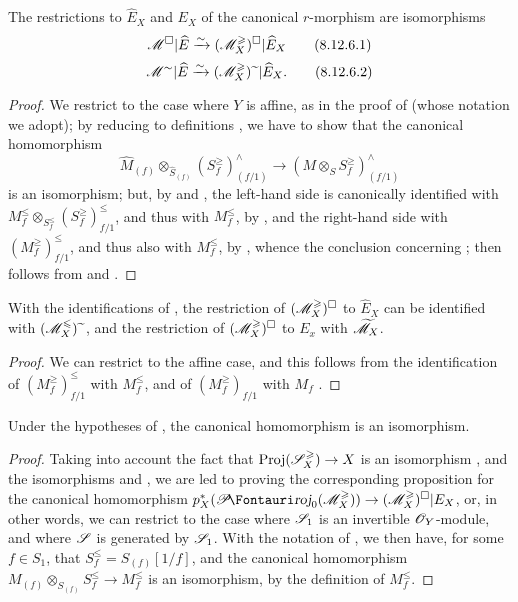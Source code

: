 \begin{proposition}[8.12.6]
\label{II.8.12.6}
The restrictions to $\widehat{E}_X$ and $E_X$ of the canonical $r$-morphism  are isomorphisms
\[
\label{II.8.12.6.1}
    \mathscr{M}^\square|\widehat{E} \xrightarrow{\sim} (\mathscr{M}_X^\geqslant)^\square|\widehat{E}_X
\tag{8.12.6.1}
\]
\[
\label{II.8.12.6.2}
    \mathscr{M}^\sim|\widehat{E} \xrightarrow{\sim} (\mathscr{M}_X^\geqslant){\,\widetilde{\,}\,}|\widehat{E}_X.
\tag{8.12.6.2}
\]
\end{proposition}

\begin{proof}
We restrict to the case where $Y$ is affine, as in the proof of  (whose notation we adopt);
by reducing to definitions , we have to show that the canonical homomorphism
\[
    \widehat{M}_{(f)}\otimes_{\widehat{S}_{(f)}}(S_f^\geq)_{(f/1)}^\wedge \to (M\otimes_S S_f^\geq)_{(f/1)}^\wedge
\]
is an isomorphism;
but, by  and , the left-hand side is canonically identified with $M_f^\leq\otimes_{S_f^\leq}(S_f^\geq)_{f/1}^\leq$, and thus with $M_f^\leq$, by , and the right-hand side with $(M_f^\geq)_{f/1}^\leq$, and thus also with $M_f^\leq$, by , whence the conclusion concerning ;
 then follows from  and .
\end{proof}

\begin{corollary}[8.12.7]
\label{II.8.12.7}
With the identifications of , the restriction of $(\mathscr{M}_X^\geqslant)^\square$ to $\widehat{E}_X$ can be identified with $(\mathscr{M}_X^\leqslant){\,\widetilde{\,}\,}$, and the restriction of $(\mathscr{M}_X^\geqslant)^\square$ to $E_x$ with $\widetilde{\mathscr{M}}_X$.
\end{corollary}

\begin{proof}
We can restrict to the affine case, and this follows from the identification of $(M_f^\geq)_{f/1}^\leq$ with $M_f^\leq$, and of $(M_f^\geq)_{f/1}$ with $M_f$ .
\end{proof}

\begin{proposition}[8.12.8]
\label{II.8.12.8}
Under the hypotheses of , the canonical homomorphism  is an isomorphism.
\end{proposition}

\begin{proof}
Taking into account the fact that $\Proj(\sh{S}_X^\geq)\to X$ is an isomorphism , and the
isomorphisms  and , we are led to proving the corresponding proposition for the canonical homomorphism $p_X^*(\shProj_0(\sh{M}_X^\geq))\to(\sh{M}_X^\geq)^\square|E_X$, or, in other words, we can restrict to the case where $\mathscr{S}_1$ is an invertible $\mathscr{O}_Y$-module, and where $\mathscr{S}$ is generated by $\mathscr{S}_1$.
With the notation of , we then have, for some $f\in S_1$, that $S_f^\leq=S_{(f)}[1/f]$, and the canonical homomorphism $M_{(f)}\otimes_{S_{(f)}}S_f^\leq\to M_f^\leq$ is an isomorphism, by the definition of $M_f^\leq$.
\end{proof}

